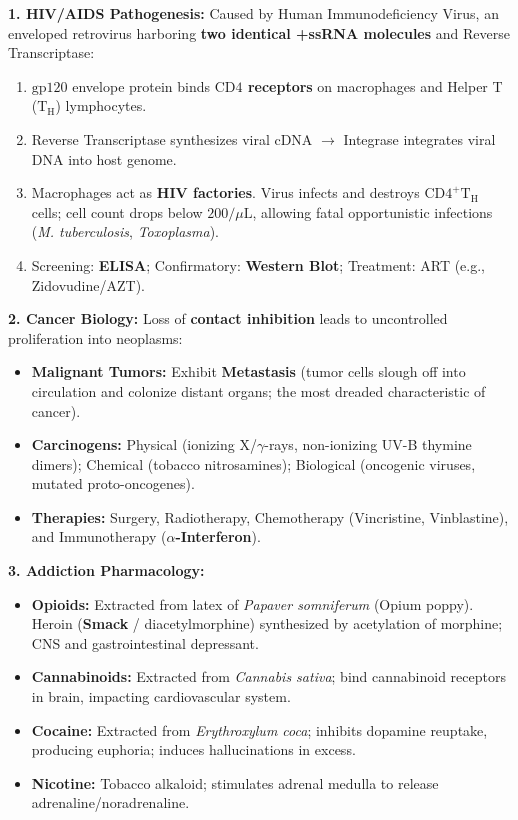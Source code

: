 \documentclass[10pt,twoside,openright]{book}
\begin{document}
\begin{conceptbox}
\textbf{1. HIV/AIDS Pathogenesis:}
Caused by Human Immunodeficiency Virus, an enveloped retrovirus harboring \textbf{two identical +ssRNA molecules} and Reverse Transcriptase:
\begin{enumerate}
  \item $\mathbf{\mathrm{gp120}}$ envelope protein binds \textbf{$\mathrm{CD4}$ receptors} on macrophages and Helper T ($\mathrm{T_H}$) lymphocytes.
  \item Reverse Transcriptase synthesizes viral cDNA $\to$ Integrase integrates viral DNA into host genome.
  \item Macrophages act as \textbf{HIV factories}. Virus infects and destroys $\mathrm{CD4}^+ \mathrm{T_H}$ cells; cell count drops below \textbf{$200/\mu\mathrm{L}$}, allowing fatal opportunistic infections (\textit{M. tuberculosis}, \textit{Toxoplasma}).
  \item Screening: \textbf{ELISA}; Confirmatory: \textbf{Western Blot}; Treatment: ART (e.g., Zidovudine/AZT).
\end{enumerate}

\textbf{2. Cancer Biology:}
Loss of \textbf{contact inhibition} leads to uncontrolled proliferation into neoplasms:
\begin{itemize}
  \item \textbf{Malignant Tumors:} Exhibit \textbf{Metastasis} (tumor cells slough off into circulation and colonize distant organs; the most dreaded characteristic of cancer).
  \item \textbf{Carcinogens:} Physical (ionizing X/$\gamma$-rays, non-ionizing UV-B thymine dimers); Chemical (tobacco nitrosamines); Biological (oncogenic viruses, mutated proto-oncogenes).
  \item \textbf{Therapies:} Surgery, Radiotherapy, Chemotherapy (Vincristine, Vinblastine), and Immunotherapy (\textbf{$\alpha$-Interferon}).
\end{itemize}

\textbf{3. Addiction Pharmacology:}
\begin{itemize}
  \item \textbf{Opioids:} Extracted from latex of \textit{Papaver somniferum} (Opium poppy). Heroin (\textbf{Smack} / diacetylmorphine) synthesized by acetylation of morphine; CNS and gastrointestinal depressant.
  \item \textbf{Cannabinoids:} Extracted from \textit{Cannabis sativa}; bind cannabinoid receptors in brain, impacting cardiovascular system.
  \item \textbf{Cocaine:} Extracted from \textit{Erythroxylum coca}; inhibits dopamine reuptake, producing euphoria; induces hallucinations in excess.
  \item \textbf{Nicotine:} Tobacco alkaloid; stimulates adrenal medulla to release adrenaline/noradrenaline.
\end{itemize}
\end{conceptbox}
\end{document}
